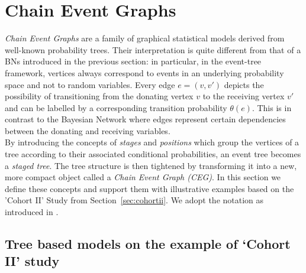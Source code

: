 \documentclass[runningheads]{llncs}
\begin{document}
\section{Chain Event Graphs}\label{sec:cegs}
\emph{Chain Event Graphs} are a family of graphical statistical models derived from well-known probability trees. Their interpretation is quite different from that of a BNs introduced in the previous section: in particular, in the event-tree framework, vertices always correspond to events in an underlying probability space and not to random variables. Every edge $e = (v, v')$ depicts the possibility of transitioning from the donating vertex $v$ to the receiving vertex $v'$ and can be labelled by a corresponding transition probability $\theta(e)$. This is in contrast to the Bayesian Network where edges represent certain dependencies between the donating and receiving variables. \\
By introducing the concepts of \emph{stages} and \emph{positions} which group the vertices of a tree according to their associated conditional probabilities, an event tree becomes a \emph{staged tree}. The tree structure is then tightened by transforming it into a new, more compact object called a \emph{Chain Event Graph (CEG)}. In this section we define these concepts and support them with illustrative examples based on the 'Cohort II' Study from Section~\ref{sec:cohortii}. We adopt the notation as introduced in \cite{smith2017cegs}. 

\subsection{Tree based models on the example of `Cohort II' study}\label{subsec:treemodels}
\end{document}
